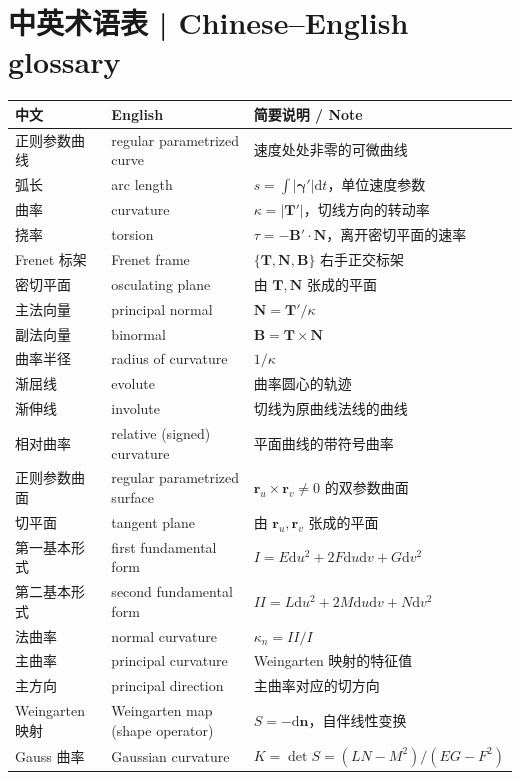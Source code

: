 \documentclass[UTF8,11pt,a4paper]{ctexart}
\newcommand{\dd}{\mathrm{d}}
\newcommand{\br}{\mathbf{r}}
\newcommand{\bn}{\mathbf{n}}
\newcommand{\bT}{\mathbf{T}}
\newcommand{\bN}{\mathbf{N}}
\newcommand{\bB}{\mathbf{B}}
\newcommand{\bgamma}{\boldsymbol{\gamma}}
\begin{document}
\section*{中英术语表 | Chinese--English glossary}
\noindent\small
\begin{longtable}{@{}>{\RaggedRight\arraybackslash}p{3.5cm}>{\RaggedRight\arraybackslash}p{4.6cm}>{\RaggedRight\arraybackslash}p{6.6cm}@{}}
\toprule
\textbf{中文} & \textbf{English} & \textbf{简要说明 / Note} \\
\midrule
\endhead
正则参数曲线 & regular parametrized curve & 速度处处非零的可微曲线 \\
弧长 & arc length & $s=\int|\bgamma'|\dd t$，单位速度参数 \\
曲率 & curvature & $\kappa=|\bT'|$，切线方向的转动率 \\
挠率 & torsion & $\tau=-\bB'\cdot\bN$，离开密切平面的速率 \\
Frenet 标架 & Frenet frame & $\{\bT,\bN,\bB\}$ 右手正交标架 \\
密切平面 & osculating plane & 由 $\bT,\bN$ 张成的平面 \\
主法向量 & principal normal & $\bN=\bT'/\kappa$ \\
副法向量 & binormal & $\bB=\bT\times\bN$ \\
曲率半径 & radius of curvature & $1/\kappa$ \\
渐屈线 & evolute & 曲率圆心的轨迹 \\
渐伸线 & involute & 切线为原曲线法线的曲线 \\
相对曲率 & relative (signed) curvature & 平面曲线的带符号曲率 \\
正则参数曲面 & regular parametrized surface & $\br_u\times\br_v\ne0$ 的双参数曲面 \\
切平面 & tangent plane & 由 $\br_u,\br_v$ 张成的平面 \\
第一基本形式 & first fundamental form & $I=E\dd u^2+2F\dd u\dd v+G\dd v^2$ \\
第二基本形式 & second fundamental form & $II=L\dd u^2+2M\dd u\dd v+N\dd v^2$ \\
法曲率 & normal curvature & $\kappa_n=II/I$ \\
主曲率 & principal curvature & Weingarten 映射的特征值 \\
主方向 & principal direction & 主曲率对应的切方向 \\
Weingarten 映射 & Weingarten map (shape operator) & $S=-\dd\bn$，自伴线性变换 \\
Gauss 曲率 & Gaussian curvature & $K=\det S=(LN-M^2)/(EG-F^2)$ \\

\end{longtable}
\end{document}
